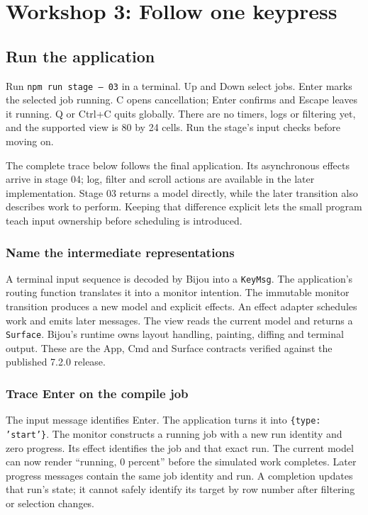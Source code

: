 \chapter{Workshop 3: Follow one keypress}\label{workshop-03}

\section{Run the application}

Run \texttt{npm run stage -- 03} in a terminal. Up and Down select jobs. Enter marks the selected job running. C opens cancellation; Enter confirms and Escape leaves it running. Q or Ctrl+C quits globally. There are no timers, logs or filtering yet, and the supported view is 80 by 24 cells. Run the stage's input checks before moving on.

The complete trace below follows the final application. Its asynchronous effects arrive in stage 04; log, filter and scroll actions are available in the later implementation. Stage 03 returns a model directly, while the later transition also describes work to perform. Keeping that difference explicit lets the small program teach input ownership before scheduling is introduced.

\subsection{Name the intermediate representations}

A terminal input sequence is decoded by Bijou into a \texttt{KeyMsg}. The application's routing function translates it into a monitor intention. The immutable monitor transition produces a new model and explicit effects. An effect adapter schedules work and emits later messages. The view reads the current model and returns a \texttt{Surface}. Bijou's runtime owns layout handling, painting, diffing and terminal output. These are the App, Cmd and Surface contracts verified against the published 7.2.0 release.



\subsection{Trace Enter on the compile job}

The input message identifies Enter. The application turns it into \texttt{\{type: 'start'\}}. The monitor constructs a running job with a new run identity and zero progress. Its effect identifies the job and that exact run. The current model can now render ``running, 0 percent'' before the simulated work completes. Later progress messages contain the same job identity and run. A completion updates that run's state; it cannot safely identify its target by row number after filtering or selection changes.

